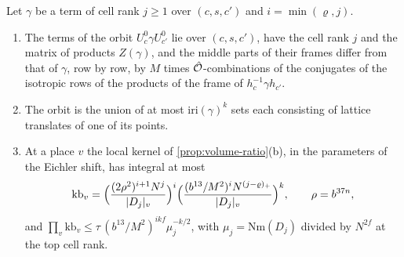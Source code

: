 \begin{lemma}\label{lem:orbit-translates}
Let $\gamma$ be a term of cell rank $j\ge1$ over $(c,s,c')$ and $i=\min(\varrho,j)$.
\begin{enumerate}[label=\textup{(\alph*)}]
\item The terms of the orbit $U^0_c\gamma U^0_{c'}$ lie over $(c,s,c')$, have the cell rank $j$ and the matrix of products $Z(\gamma)$, and the middle parts of their frames differ from that of $\gamma$, row by row, by
$M$ times $\hat{\mathcal{O}}$-combinations of the conjugates of the isotropic rows of the products of the frame of $h_c^{-1}\gamma h_{c'}$.
\item The orbit is the union of at most $\mathrm{iri}(\gamma)^k$ sets each consisting of lattice translates of one of its points.
\item At a place $v$ the local kernel of \cref{prop:volume-ratio}(b), in the parameters of the Eichler shift, has integral at most
\[
  \mathrm{kb}_v=\Bigl(\frac{(2\rho^2)^{i+1}N^j}{\lvert D_j\rvert_v}\Bigr)^i\Bigl(\frac{(b^{13}/M^2)^iN^{(j-\varrho)_+}}{\lvert D_j\rvert_v}\Bigr)^k,\qquad\rho=b^{37n},
\]
and $\prod_v\mathrm{kb}_v\le\tau\,(b^{13}/M^2)^{ikf}\mu_j^{-k/2}$, with $\mu_j=\mathrm{Nm}(D_j)$ divided by $N^{2f}$ at the top cell rank.
\end{enumerate}
\end{lemma}


